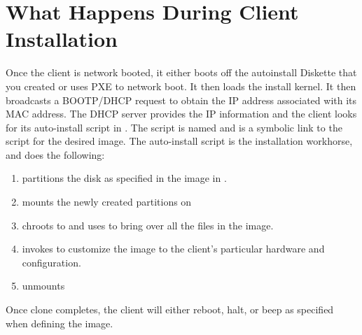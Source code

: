 %
%
%

\section{What Happens During Client Installation}
\label{app:client-install}

Once the client is network booted, it either boots off the autoinstall
Diskette that you created or uses PXE to network boot.  It then loads
the install kernel.  It then broadcasts a BOOTP/DHCP request to obtain
the IP address associated with its MAC address. The DHCP server
provides the IP information and the client looks for its auto-install
script in . The script is named
 and is a symbolic link to the script for the
desired image.  The auto-install script is the installation workhorse,
and does the following:

\begin{enumerate}
\item partitions the disk as specified in the image in
  .
        
\item mounts the newly created partitions on 
  
\item chroots to  and uses  to bring over all the
  files in the image.
  
\item invokes  to customize the image to the
  client's particular hardware and configuration.

\item unmounts 
\end{enumerate}

Once clone completes, the client will either reboot, halt, or beep as
specified when defining the image.

